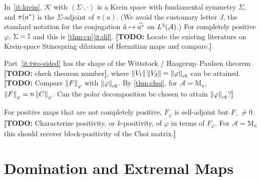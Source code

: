 \documentclass[12pt]{article}
\newcommand{\todo}[1]{\textcolor{\mysubcolor}{\small\textbf{[TODO:} #1\textbf{]}}}
\newcommand{\alg}{\mathcal{A}}             %
\newcommand{\dil}{\mathcal{K}}             %
\newcommand{\Mn}[1]{\mathrm{M}_{#1}}       %
\newcommand{\ip}[2]{\left\langle #1 , #2 \right\rangle}
\newcommand{\Ltwo}{L^2\br{\alg}}
\newcommand{\Fphi}{F_{\varphi}}
\newcommand{\Choi}{C_{\varphi}}
\begin{document}
\begin{remark}
In~\ref{it:krein}, \(\dil\) with \(\ip{\Sigma\cdot}{\cdot}\) is a Krein space with fundamental symmetry
\(\Sigma\), and \(\pi(a^*)\) is the \(\Sigma\)-adjoint of \(\pi(a)\). (We
avoid the customary letter \(J\), the standard notation for the conjugation
\(\hat a \mapsto \widehat{a^*}\) on \(\Ltwo\).) For completely positive \(\varphi\), \(\Sigma = {\mathbb I}\) and this is \cref{thm:cp}\ref{it:dil}.
\todo{Locate the existing literature on Krein-space Stinespring dilations of
Hermitian maps and compare.}

Part~\ref{it:two-sided} has the shape of the Wittstock / Haagerup--Paulsen
theorem~\cite[Theorem~8.4]{Paulsen2002} \todo{check theorem number}, where
\(\left\| V_1 \right\|\left\| V_2 \right\| = \left\| \varphi \right\|_{cb}\) can be attained.
\todo{Compare \(\norm\Fphi\) with \(\left\| \varphi \right\|_{cb}\). By \cref{thm:choi}, for
\(\alg = \Mn n\), \(\norm\Fphi = n\norm\Choi\). Can the polar decomposition be
chosen to attain \(\left\| \varphi \right\|_{cb}\)?}

For positive maps that are not completely positive, \(\Fphi\) is self-adjoint but
\(F_- \ne 0\). \todo{Characterize positivity, or \(k\)-positivity, of \(\varphi\)
in terms of \(\Fphi\). For \(\alg = \Mn n\) this should recover block-positivity
of the Choi matrix.}
\end{remark}

\section{Domination and Extremal Maps}
\label{sec:extremal}
\end{document}
